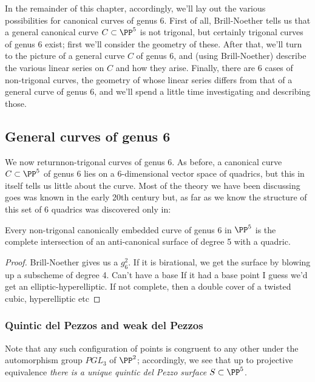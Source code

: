 In the remainder of this chapter, accordingly, we'll lay out the various possibilities for canonical curves of genus 6. First of all,  Brill-Noether tells us that a general canonical curve $C \subset \PP^5$ is not trigonal, but certainly trigonal curves of genus 6 exist; first we'll consider the geometry of these. After that, we'll turn to the picture of a general curve $C$ of genus 6, and (using Brill-Noether) describe the various linear series on $C$ and how they arise. Finally, there are 6 cases of non-trigonal curves, the geometry of whose linear series differs from that of a general curve of genus 6, and we'll spend a little time investigating and describing those.

\subsection{General curves of genus 6} 

We now returnnon-trigonal curves of genus 6. As before, a canonical curve $C \subset \PP^5$ of genus 6 lies on a 6-dimensional vector space of quadrics, but this in itself tells us little about the curve. Most of the theory we have been discussing goes was known in the early 20th century but, as far as we know the structure of this set of
6 quadrics was discovered only in:

\begin{theorem}\label{general genus 6}
Every non-trigonal canonically embedded curve of genus 6 in $\PP^5$ is the complete intersection of an anti-canonical surface of degree 5 with a quadric.
\end{theorem}

\begin{proof}
 Brill-Noether gives us a $g^2_6$. If it is birational, we get the surface by blowing up a subscheme of degree 4. Can't have a base If it had a base point I guess we'd get an elliptic-hyperelliptic. If not complete, then a double cover of a twisted cubic, hyperelliptic etc
\end{proof}

\subsubsection{Quintic del Pezzos and weak del Pezzos}

Note that any such configuration of points is congruent to any other under the automorphism group $PGL_3$ of $\PP^2$; accordingly, we see that up to projective equivalence \emph{there is a unique quintic del Pezzo surface $S \subset \PP^5$}.

